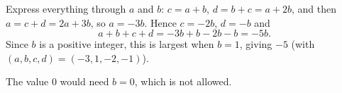 Express everything through $a$ and $b$: $c=a+b$, $d=b+c=a+2b$, and then $a=c+d=2a+3b$, so $a=-3b$. Hence $c=-2b$, $d=-b$ and
\[
a+b+c+d=-3b+b-2b-b=-5b .
\]
Since $b$ is a positive integer, this is largest when $b=1$, giving $\boxed{-5}$ (with $(a,b,c,d)=(-3,1,-2,-1)$).

The value $0$ would need $b=0$, which is not allowed.

